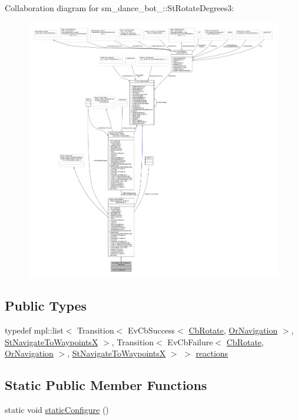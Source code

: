 Collaboration diagram for sm\+\_\+dance\+\_\+bot\+\_\+:\+:St\+Rotate\+Degrees3\+:
\nopagebreak
\begin{figure}[H]
\begin{center}
\leavevmode
\includegraphics[width=350pt]{structsm__dance__bot__2_1_1StRotateDegrees3__coll__graph}
\end{center}
\end{figure}
\subsection*{Public Types}
\begin{DoxyCompactItemize}
\item 
typedef mpl\+::list$<$ Transition$<$ Ev\+Cb\+Success$<$ \hyperlink{classcl__move__base__z_1_1CbRotate}{Cb\+Rotate}, \hyperlink{classsm__dance__bot__2_1_1OrNavigation}{Or\+Navigation} $>$, \hyperlink{structsm__dance__bot__2_1_1StNavigateToWaypointsX}{St\+Navigate\+To\+WaypointsX} $>$, Transition$<$ Ev\+Cb\+Failure$<$ \hyperlink{classcl__move__base__z_1_1CbRotate}{Cb\+Rotate}, \hyperlink{classsm__dance__bot__2_1_1OrNavigation}{Or\+Navigation} $>$, \hyperlink{structsm__dance__bot__2_1_1StNavigateToWaypointsX}{St\+Navigate\+To\+WaypointsX} $>$ $>$ \hyperlink{structsm__dance__bot__2_1_1StRotateDegrees3_a3303bfde484081a5fdf1887114bdc6e9}{reactions}
\end{DoxyCompactItemize}
\subsection*{Static Public Member Functions}
\begin{DoxyCompactItemize}
\item 
static void \hyperlink{structsm__dance__bot__2_1_1StRotateDegrees3_a9d399bede58a43d648f230e5c61f0f32}{static\+Configure} ()
\end{DoxyCompactItemize}
